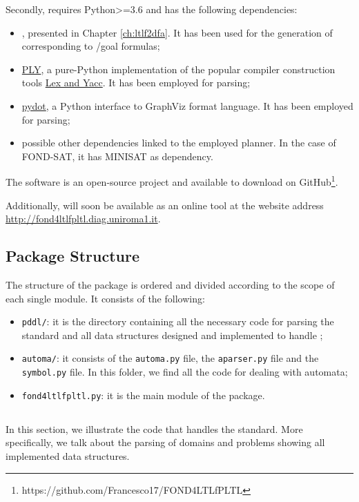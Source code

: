 Secondly, \FONDFOR requires Python>=3.6 and has the following dependencies:
\begin{itemize}
\item \LTLfToDFA, presented in Chapter \ref{ch:ltlf2dfa}. It has been used for the generation of \DFAs corresponding to \LTLf/\PLTL goal formulas;
\item \href{http://www.dabeaz.com/ply/ply.html}{PLY}, a pure-Python implementation of the popular compiler construction tools \href{http://dinosaur.compilertools.net/}{Lex and Yacc}. It has been employed for \PDDL parsing;
\item \href{https://pypi.org/project/pydot/}{pydot}, a Python interface to GraphViz format language. It has been employed for \DFAs parsing;
\item possible other dependencies linked to the employed planner. In the case of FOND-SAT, it has MINISAT as dependency.
\end{itemize} 
The \FONDFOR software is an open-source project and available to download on GitHub\footnote{https://github.com/Francesco17/FOND4LTLfPLTL}.

Additionally, \FONDFOR will soon be available as an online tool at the website address \href{http://fond4ltlfpltl.diag.uniroma1.it}{http://fond4ltlfpltl.diag.uniroma1.it}.
\subsection{Package Structure}
The structure of the \FONDFOR package is ordered and divided according to the scope of each single module. It consists of the following:
\begin{itemize}
\item \texttt{pddl/}: it is the directory containing all the necessary code for parsing the \PDDL standard and all data structures designed and implemented to handle \PDDL;
\item  \texttt{automa/}: it consists of the \texttt{automa.py} file, the \texttt{aparser.py} file and the \texttt{symbol.py} file. In this folder, we find all the code for dealing with automata;
\item \texttt{fond4ltlfpltl.py}: it is the main module of the package.
\end{itemize}
\subsection{\PDDL}\label{sec:impl-pddl}
In this section, we illustrate the code that handles the \PDDL standard. More specifically, we talk about the parsing of \PDDL domains and problems showing all implemented data structures.

